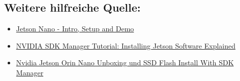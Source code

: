 \documentclass{article}
\begin{document}
\subsection{Weitere hilfreiche Quelle:}
\begin{itemize}
    \item \textcolor{blue}{\href{https://youtu.be/km0yT99eVTY?feature=shared}{Jetson Nano - Intro, Setup and Demo}}
    \item \textcolor{blue}{\href{https://youtu.be/Ucg5Zqm9ZMk?feature=shared}{NVIDIA SDK Manager Tutorial: Installing Jetson Software Explained}}
    \item \textcolor{blue}{\href{https://youtu.be/FX2exKW_20E?feature=shared}{Nvidia Jetson Orin Nano Unboxing und SSD Flash Install With SDK Manager}}
\end{itemize}
\end{document}
